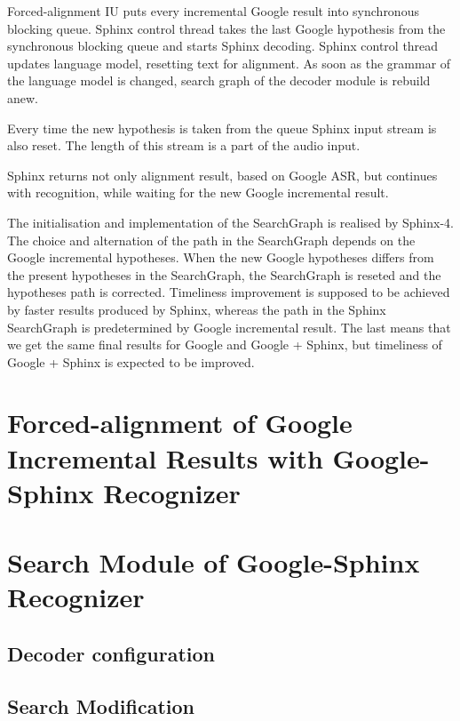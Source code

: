 Forced-alignment IU puts every incremental Google result into synchronous
blocking queue. Sphinx control thread takes the last Google hypothesis from the
synchronous blocking queue and starts Sphinx decoding. Sphinx control thread
updates language model, resetting text for alignment. As soon as the grammar of
the language model is changed, search graph of the decoder module is rebuild
anew. 

Every time the new hypothesis is taken from the queue Sphinx input stream  is
also reset. The length of this stream is a part of the audio input.  


Sphinx returns not only alignment result, based on Google ASR, but continues
with recognition, while waiting for the new Google incremental result. 

The initialisation and implementation of the SearchGraph is realised by
Sphinx-4. The choice and alternation of the path in
the SearchGraph depends on the Google incremental hypotheses. 
When the new Google hypotheses differs from the present hypotheses in the
SearchGraph, the SearchGraph is reseted and the hypotheses path is
corrected.  Timeliness improvement is supposed to be achieved by faster results
produced by Sphinx, whereas the path in the Sphinx SearchGraph is predetermined
by Google incremental result. The last means that we get the same final results
for Google and Google + Sphinx, but timeliness of Google + Sphinx
is expected to be improved. 



\section {Forced-alignment of Google Incremental Results with Google-Sphinx
Recognizer}
\section {Search Module of Google-Sphinx Recognizer}
\subsection {Decoder configuration}
\subsection {Search Modification}